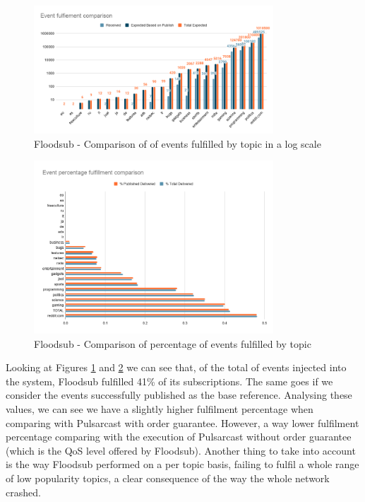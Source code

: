 \begin{figure}[!htb]
  \centering
  \includegraphics[width=0.8\textwidth]{img/graph-floodsub-event-fulfillment-comparison.png}
  \caption{Floodsub - Comparison of of events fulfilled by topic in a log scale}
  \label{fig:graph-floodsub-event-fulfillment-comparison}
\end{figure}

\begin{figure}[!htb]
  \centering
  \includegraphics[width=0.8\textwidth]{img/graph-floodsub-event-percentage-fulfillment-comparison.png}
  \caption{Floodsub - Comparison of percentage of events fulfilled by topic}
  \label{fig:graph-floodsub-event-percentage-fulfillment-comparison}
\end{figure}

Looking at Figures \ref{fig:graph-floodsub-event-fulfillment-comparison} and
\ref{fig:graph-floodsub-event-percentage-fulfillment-comparison} we can see
that, of the total of events injected into the system, Floodsub fulfilled 41\%
of its subscriptions. The same goes if we consider the events successfully
published as the base reference. Analysing these values, we can see we have a
slightly higher fulfilment percentage when comparing with Pulsarcast with order
guarantee. However, a way lower fulfilment percentage comparing with the
execution of Pulsarcast without order guarantee (which is the QoS level offered
by Floodsub). Another thing to take into account is the way Floodsub performed
on a per topic basis, failing to fulfil a  whole range of low popularity
topics, a clear consequence of the way the whole network crashed.

